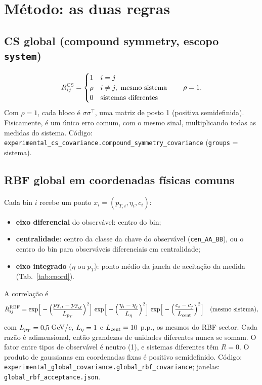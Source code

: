 \documentclass[11pt,a4paper]{article}
\newcommand{\arq}[1]{\texttt{\nolinkurl{#1}}}
\begin{document}
\section{Método: as duas regras}
\subsection{CS global (compound symmetry, escopo \texttt{system})}
\begin{equation}
R^{\rm CS}_{ij}=\begin{cases}1 & i=j\\ \rho & i\neq j,\ \text{mesmo sistema}\\ 0 & \text{sistemas diferentes}\end{cases}\qquad \rho=1 .
\end{equation}
Com $\rho=1$, cada bloco é $\sigma\sigma^{\!\top}$, uma matriz de posto 1 (positiva semidefinida). Fisicamente, é um único
erro comum, com o mesmo sinal, multiplicando todas as medidas do sistema.
Código: \arq{experimental_cs_covariance.compound_symmetry_covariance} (\texttt{groups} = sistema).

\subsection{RBF global em coordenadas físicas comuns}
Cada bin $i$ recebe um ponto $x_i=(p_{T,i},\eta_i,c_i)$:
\begin{itemize}[nosep]
\item \textbf{eixo diferencial} do observável: centro do bin;
\item \textbf{centralidade}: centro da classe da chave do observável (\texttt{cen\_AA\_BB}), ou o centro do bin para
observáveis diferenciais em centralidade;
\item \textbf{eixo integrado} ($\eta$ ou $p_T$): ponto médio da janela de aceitação da medida (Tab.~\ref{tab:coord}).
\end{itemize}
A correlação é
\begin{equation}
R^{\rm RBF}_{ij}=\exp\!\Big[-\Big(\frac{p_{T,i}-p_{T,j}}{L_{p_T}}\Big)^2\Big]\,
\exp\!\Big[-\Big(\frac{\eta_i-\eta_j}{L_{\eta}}\Big)^2\Big]\,
\exp\!\Big[-\Big(\frac{c_i-c_j}{L_{\rm cent}}\Big)^2\Big]\quad(\text{mesmo sistema}),
\end{equation}
com $L_{p_T}=0{,}5$\,GeV/$c$, $L_\eta=1$ e $L_{\rm cent}=10$ p.p., os mesmos do RBF sector. Cada razão é
adimensional, então grandezas de unidades diferentes nunca se somam. O fator entre tipos de observável é neutro (1), e
sistemas diferentes têm $R=0$. O produto de gaussianas em coordenadas fixas é positivo semidefinido.
Código: \arq{experimental_global_covariance.global_rbf_covariance}; janelas: \arq{global_rbf_acceptance.json}.
\end{document}
